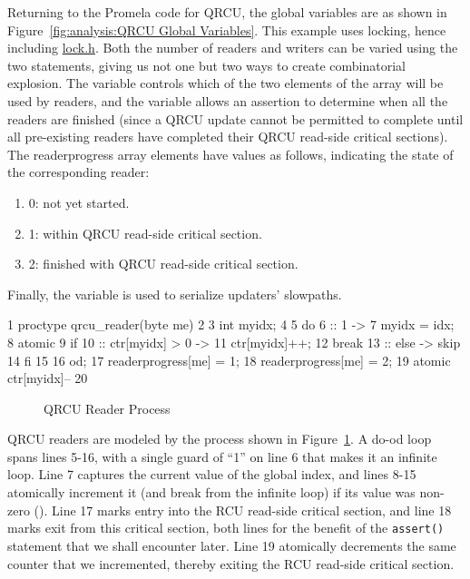 Returning to the Promela code for QRCU, the global variables are as shown in
Figure~\ref{fig:analysis:QRCU Global Variables}.
This example uses locking, hence including \url{lock.h}.
Both the number of readers and writers can be varied using the
two  statements, giving us not one but two ways to create
combinatorial explosion.
The  variable controls which of the two elements of the 
array will be used by readers, and the  variable
allows an assertion to determine when all the readers are finished
(since a QRCU update cannot be permitted to complete until all
pre-existing readers have completed their QRCU read-side critical
sections).
The readerprogress array elements have values as follows,
indicating the state of the corresponding reader:

\begin{enumerate}
\item	0: not yet started.
\item	1: within QRCU read-side critical section.
\item	2: finished with QRCU read-side critical section.
\end{enumerate}

Finally, the  variable is used to serialize updaters' slowpaths.

{ \scriptsize
\begin{verbbox}
  1 proctype qrcu_reader(byte me)
  2 {
  3   int myidx;
  4
  5   do
  6   :: 1 ->
  7     myidx = idx;
  8     atomic {
  9       if
 10       :: ctr[myidx] > 0 ->
 11         ctr[myidx]++;
 12         break
 13       :: else -> skip
 14       fi
 15     }
 16   od;
 17   readerprogress[me] = 1;
 18   readerprogress[me] = 2;
 19   atomic { ctr[myidx]-- }
 20 }
\end{verbbox}
}
\begin{figure}[htbp]
\centering
\theverbbox
\caption{QRCU Reader Process}
\label{fig:analysis:QRCU Reader Process}
\end{figure}

QRCU readers are modeled by the  process shown in
Figure~\ref{fig:analysis:QRCU Reader Process}.
A do-od loop spans lines 5-16, with a single guard of ``1''
on line 6 that makes it an infinite loop.
Line 7 captures the current value of the global index, and lines 8-15
atomically increment it (and break from the infinite loop)
if its value was non-zero ().
Line 17 marks entry into the RCU read-side critical section, and
line 18 marks exit from this critical section, both lines for the benefit of
the {\tt assert()} statement that we shall encounter later.
Line 19 atomically decrements the same counter that we incremented,
thereby exiting the RCU read-side critical section.

